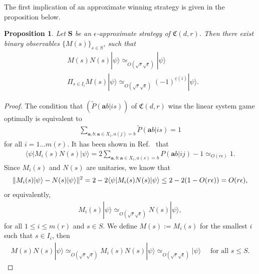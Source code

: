 \documentclass[11pt,letterpaper]{article}
\newcommand{\ket}[1]{|#1\rangle}
\newcommand{\bra}[1]{\langle#1|}
\DeclarePairedDelimiter{\norm}{\lVert}{\rVert}
\newcommand{\1}{\mathbb{1}}
\newcommand{\mr}{m(r)}
\newcommand{\uc}{\underline{c}}
\newcommand{\fC}{\mathfrak{C}}
\newcommand{\ba}{\pmb{a}}
\newcommand{\bS}{\pmb{S}}
\newcommand{\pr}[2]{P(#1|#2)}
\newcommand{\tpr}[2]{\tilde{P}(#1|#2)}
\newcommand{\ep}{\epsilon}
\newcommand{\se}{\sqrt{\epsilon}}
\newcommand{\sr}{\sqrt{r}}
\newcommand{\appd}[1]{\simeq_{#1}}
\newtheorem{proposition}[theorem]{Proposition}
\theoremstyle{definition}
\begin{document}
The first implication of an approximate winning strategy is given in the proposition below.
\begin{proposition}
	\label{prop:lct_base}
	Let $\bS$ be an $\ep$-approximate strategy of $\fC(d,r)$.
	Then there exist binary observables $\{ M(s) \}_{s \in S} $, such that
	\begin{align}
		&M(s) N(s) \ket{\psi} \appd{O(\sr\se)} \ket{\psi} \\
		&\Pi_{s \in I_i} M(s) \ket{\psi} \appd{O(\sr\se)}(-1)^{\uc(i)} \ket{\psi}.
	\end{align}
\end{proposition}
\begin{proof}
The condition that $(\tpr{\ba b}{is})$ of $\fC(d,r)$ wins the linear system game optimally is equivalent to
\begin{align*}
\sum_{\ba,b: \ba \in X_i, a(j) = b} \tpr{\ba b}{is} = 1
\end{align*}
for all $i = 1 \dots \mr$.
It has been shown in Ref.~\cite{slofstra2017} that 
\begin{align*}
	\bra{\psi} M_i(s) N(s) \ket{\psi} = 2 \sum_{\ba,b: \ba \in X_i, a(s) = b} \pr{\ba b}{ij} -1 \appd{O(r \ep)} 1.
\end{align*}
Since $M_i(s)$ and $N(s)$ are unitaries, we know that
\begin{align*}
    \norm{M_i(s)\ket{\psi} - N(s)\ket{\psi}}^2 
    = 2 - 2 \bra{\psi}M_i(s)N(s) \ket{\psi} 
    \leq 2 - 2(1 - O(r\ep)) = O(r\ep),
\end{align*}
or equivalently,
\begin{align*}
	M_{i}(s) \ket{\psi} \appd{O(\sr\se)} N(s) \ket{\psi},
\end{align*}
for all $1 \leq i \leq \mr$ and $s \in S$.
We define $M(s) := M_{i}(s)$ for the smallest $i$ such that $ s \in I_i$, then 
\begin{align*}
	M(s) N(s) \ket{\psi} \appd{O(\sr\se)} M_{i}(s)N(s)\ket{\psi} \appd{O(\sr\se)} \ket{\psi} \quad \text{ for all } s \leq S.
\end{align*}


\end{proof}
\end{document}
